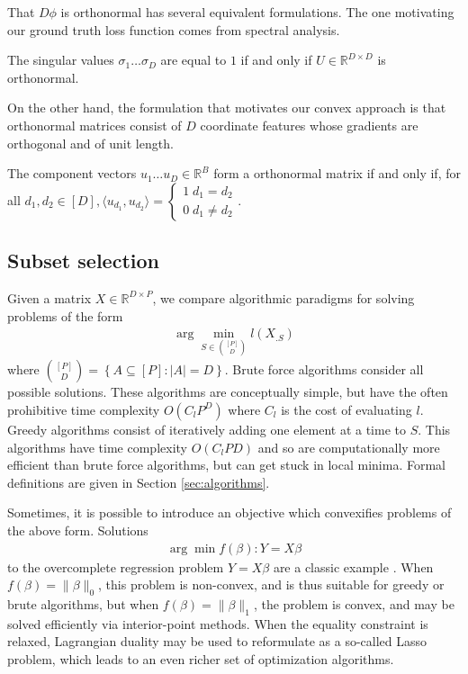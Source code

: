 That $D\phi$ is orthonormal has several equivalent formulations.
The one motivating our ground truth loss function comes from spectral analysis.
\begin{proposition}
\label{prop:orthonormal_spectrum}
The singular values $\sigma_1 \dots \sigma_D$ are equal to $1$ if and only if $U \in \mathbb{R}^{D \times D}$ is orthonormal.
\end{proposition}
On the other hand, the formulation that motivates our convex approach is that orthonormal matrices consist of $D$ coordinate features whose gradients are orthogonal and of unit length.
\begin{proposition}
\label{prop:orthonormal_basis}
The component vectors $u_1 \dots u_D \in \mathbb R^B$ form a orthonormal matrix if and only if, for all $d_1, d_2 \in [D], \langle u_{d_1}, u_{d_2} \rangle = \begin{cases}
1 \; d_1 = d_2 \\ 
0 \; d_1 \neq d_2 
\end{cases}$.
\end{proposition}


\subsection{Subset selection}

Given a matrix $ X \in \mathbb R^{D \times P}$, we compare algorithmic paradigms for solving problems of the form
\begin{align}
\label{prog:ground_truth}
\arg \min_{ S \in \binom{[P]}{D}} l ( X_{. S})
\end{align}
where $\binom{[P]}{D} = \left\{ A \subseteq [P] : \left|A\right| = D \right\}$.
Brute force algorithms consider all possible solutions.
These algorithms are conceptually simple, but have the often prohibitive time complexity $O(C_lP^D)$ where $C_l$ is the cost of evaluating $l$.
Greedy algorithms consist of iteratively adding one element at a time to $ S$.
This algorithms have time complexity $O(C_lPD)$ and so are computationally more efficient than brute force algorithms, but can get stuck in local minima.
Formal definitions are given in Section \ref{sec:algorithms}.

Sometimes, it is possible to introduce an objective which convexifies problems of the above form.
Solutions
\begin{align}
\arg \min f(\beta) : Y  = X\beta 
\end{align}
to the overcomplete regression problem $Y = X \beta$ are a classic example \citep{Chen2001-hh}.
When $f(\beta) = \|\beta\|_0$, this problem is non-convex, and is thus suitable for greedy or brute algorithms, but when $f(\beta) =\|\beta\|_1$, the problem is convex, and may be solved efficiently via interior-point methods.
When the equality constraint is relaxed, Lagrangian duality may be used to reformulate as a so-called Lasso problem, which leads to an even richer set of optimization algorithms. %

